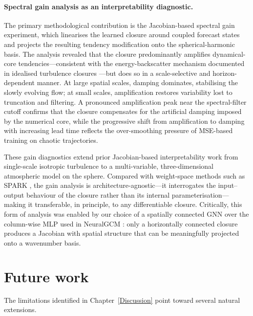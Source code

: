 \paragraph{Spectral gain analysis as an interpretability diagnostic.}
The primary methodological contribution is the Jacobian-based spectral gain experiment, which linearises the learned closure around coupled forecast states and projects the resulting tendency modification onto the spherical-harmonic basis. The analysis revealed that the closure predominantly amplifies dynamical-core tendencies---consistent with the energy-backscatter mechanism documented in idealised turbulence closures \citep{guan2022stable, subel2023explaining}---but does so in a scale-selective and horizon-dependent manner. At large spatial scales, damping dominates, stabilising the slowly evolving flow; at small scales, amplification restores variability lost to truncation and filtering. A pronounced amplification peak near the spectral-filter cutoff confirms that the closure compensates for the artificial damping imposed by the numerical core, while the progressive shift from amplification to damping with increasing lead time reflects the over-smoothing pressure of MSE-based training on chaotic trajectories.

These gain diagnostics extend prior Jacobian-based interpretability work \citep{Portwood2021} from single-scale isotropic turbulence to a multi-variable, three-dimensional atmospheric model on the sphere. Compared with weight-space methods such as SPARK \citep{subel2023explaining}, the gain analysis is architecture-agnostic---it interrogates the input--output behaviour of the closure rather than its internal parameterisation---making it transferable, in principle, to any differentiable closure. Critically, this form of analysis was enabled by our choice of a spatially connected GNN over the column-wise MLP used in NeuralGCM \citep{neuralgcm}: only a horizontally connected closure produces a Jacobian with spatial structure that can be meaningfully projected onto a wavenumber basis.

\section{Future work}

The limitations identified in Chapter~\ref{Discussion} point toward several natural extensions.

